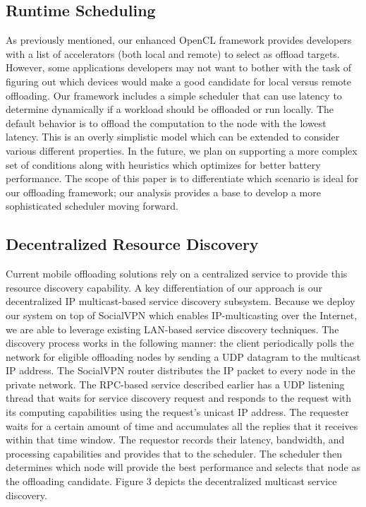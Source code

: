\documentclass[10pt, conference, compsocconf]{IEEEtran}
\begin{document}
\subsection{Runtime Scheduling}
%
As previously mentioned, our enhanced OpenCL framework provides developers 
with a list of accelerators (both local and remote) to select as offload 
targets.
%
However, some applications developers may not want to bother with the task
of figuring out which devices would make a good candidate for local versus 
remote offloading.
%
Our framework includes a simple scheduler that can use latency to determine
dynamically if a workload should be offloaded or run locally.
%
The default behavior is to offload the computation to the node with the 
lowest latency.
%
This is an overly simplistic model which can be extended to consider 
various different properties.
%
In the future, we plan on supporting a more complex set of conditions along
with heuristics which optimizes for better battery performance.
%
The scope of this paper is to differentiate which scenario is ideal for our
offloading framework; our analysis provides a base to develop a more 
sophisticated scheduler moving forward. 
%
\subsection{Decentralized Resource Discovery}
%
Current mobile offloading solutions rely on a centralized service to provide
this resource discovery capability.
%
A key differentiation of our approach is our decentralized IP multicast-based
service discovery subsystem.
%
Because we deploy our system on top of SocialVPN which enables IP-multicasting
over the Internet, we are able to leverage existing LAN-based service discovery 
techniques.
%
The discovery process works in the following manner: the client periodically
polls the network for eligible offloading nodes by sending a UDP datagram to
the multicast IP address.
%
The SocialVPN router distributes the IP packet to every node in the private 
network.
%
The RPC-based service described earlier has a UDP listening thread that waits
for service discovery request and responds to the request with its computing
capabilities using the request’s unicast IP address.
%
The requester waits for a certain amount of time and accumulates all the 
replies that it receives within that time window.
%
The requestor records their latency, bandwidth, and processing capabilities
and provides that to the scheduler.
%
The scheduler then determines which node will provide the best performance
and selects that node as the offloading candidate.
%
Figure 3 depicts the decentralized multicast service discovery.
%
\end{document}

